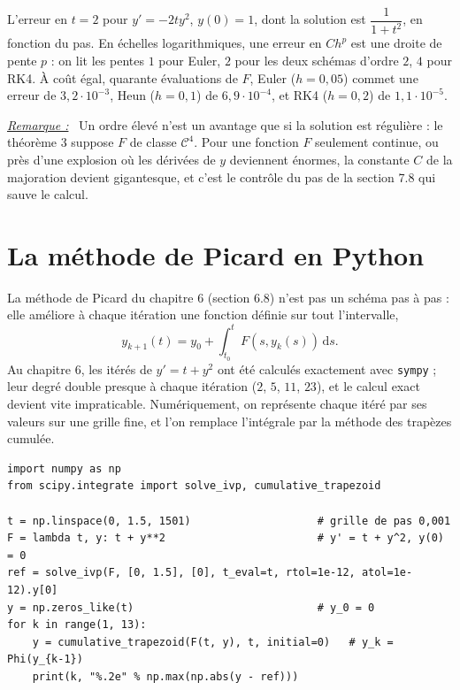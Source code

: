 \documentclass[a4paper,twoside]{report}
\newenvironment{remarque}%
 {\par\needspace{6\baselineskip}\vspace{1mm}\begin{list}{}{\leftmargin=1cm \rightmargin=0.5cm}\item[]%
  \textit{\underline{Remarque :}}~}%
 {\end{list}\vspace{1mm}}
\newcommand{\dd}{\mathrm{d}}                      %
\newcommand{\Cc}{\mathcal{C}}                     %
\begin{document}
\noindent L'erreur en $t = 2$ pour $y' = -2ty^{2}$, $y(0) = 1$, dont la solution est $\dfrac{1}{1 + t^{2}}$, en fonction du pas. En échelles logarithmiques, une erreur en $C h^{p}$ est une droite de pente $p$ : on lit les pentes $1$ pour Euler, $2$ pour les deux schémas d'ordre $2$, $4$ pour RK4. À coût égal, quarante évaluations de $F$, Euler ($h = 0{,}05$) commet une erreur de $3{,}2 \cdot 10^{-3}$, Heun ($h = 0{,}1$) de $6{,}9 \cdot 10^{-4}$, et RK4 ($h = 0{,}2$) de $1{,}1 \cdot 10^{-5}$.

\begin{remarque}
Un ordre élevé n'est un avantage que si la solution est régulière : le théorème 3 suppose $F$ de classe $\Cc^{4}$. Pour une fonction $F$ seulement continue, ou près d'une explosion où les dérivées de $y$ deviennent énormes, la constante $C$ de la majoration devient gigantesque, et c'est le contrôle du pas de la section 7.8 qui sauve le calcul.
\end{remarque}
\section[Picard en Python]{La méthode de Picard en Python}

La méthode de Picard du chapitre 6 (section 6.8) n'est pas un schéma pas à pas : elle améliore à chaque itération une fonction définie sur tout l'intervalle,
\[ y_{k + 1}(t) = y_{0} + \int_{t_{0}}^{t} F(s, y_{k}(s))\,\dd s. \]
Au chapitre 6, les itérés de $y' = t + y^{2}$ ont été calculés exactement avec \texttt{sympy} ; leur degré double presque à chaque itération ($2$, $5$, $11$, $23$), et le calcul exact devient vite impraticable. Numériquement, on représente chaque itéré par ses valeurs sur une grille fine, et l'on remplace l'intégrale par la méthode des trapèzes cumulée.

\begin{lstlisting}
import numpy as np
from scipy.integrate import solve_ivp, cumulative_trapezoid

t = np.linspace(0, 1.5, 1501)                    # grille de pas 0,001
F = lambda t, y: t + y**2                        # y' = t + y^2, y(0) = 0
ref = solve_ivp(F, [0, 1.5], [0], t_eval=t, rtol=1e-12, atol=1e-12).y[0]
y = np.zeros_like(t)                             # y_0 = 0
for k in range(1, 13):
    y = cumulative_trapezoid(F(t, y), t, initial=0)   # y_k = Phi(y_{k-1})
    print(k, "%.2e" % np.max(np.abs(y - ref)))
\end{lstlisting}
\end{document}
